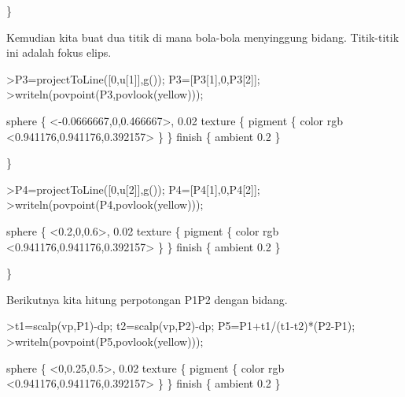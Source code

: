 \documentclass[a4paper,10pt]{article}
\begin{document}
\begin{eulernotebook}
\begin{eulercomment}
\begin{eulercomment}
\begin{eulercomment}
\begin{eulercomment}
\begin{eulercomment}
\begin{eulercomment}
\begin{eulercomment}
\begin{eulercomment}
\begin{eulercomment}
\begin{eulercomment}
\begin{eulercomment}
\begin{eulercomment}
\begin{eulercomment}
\begin{eulercomment}
\begin{eulercomment}
\begin{eulercomment}
\begin{euleroutput}
  \}
\end{euleroutput}
\begin{eulercomment}
Kemudian kita buat dua titik di mana bola-bola menyinggung bidang.
Titik-titik ini adalah fokus elips.
\end{eulercomment}
\begin{eulerprompt}
>P3=projectToLine([0,u[1]],g()); P3=[P3[1],0,P3[2]];
>writeln(povpoint(P3,povlook(yellow)));
\end{eulerprompt}
\begin{euleroutput}
  sphere \{ <-0.0666667,0,0.466667>, 0.02 texture \{ pigment \{ color rgb <0.941176,0.941176,0.392157> \}  \} 
   finish \{ ambient 0.2 \} 
  
  \}
\end{euleroutput}
\begin{eulerprompt}
>P4=projectToLine([0,u[2]],g()); P4=[P4[1],0,P4[2]];
>writeln(povpoint(P4,povlook(yellow)));
\end{eulerprompt}
\begin{euleroutput}
  sphere \{ <0.2,0,0.6>, 0.02 texture \{ pigment \{ color rgb <0.941176,0.941176,0.392157> \}  \} 
   finish \{ ambient 0.2 \} 
  
  \}
\end{euleroutput}
\begin{eulercomment}
Berikutnya kita hitung perpotongan P1P2 dengan bidang.
\end{eulercomment}
\begin{eulerprompt}
>t1=scalp(vp,P1)-dp; t2=scalp(vp,P2)-dp; P5=P1+t1/(t1-t2)*(P2-P1);
>writeln(povpoint(P5,povlook(yellow)));
\end{eulerprompt}
\begin{euleroutput}
  sphere \{ <0,0.25,0.5>, 0.02 texture \{ pigment \{ color rgb <0.941176,0.941176,0.392157> \}  \} 
   finish \{ ambient 0.2 \} 
  

\end{euleroutput}
\end{eulercomment}
\end{eulercomment}
\end{eulercomment}
\end{eulercomment}
\end{eulercomment}
\end{eulercomment}
\end{eulercomment}
\end{eulercomment}
\end{eulercomment}
\end{eulercomment}
\end{eulercomment}
\end{eulercomment}
\end{eulercomment}
\end{eulercomment}
\end{eulercomment}
\end{eulercomment}
\end{eulernotebook}
\end{document}
